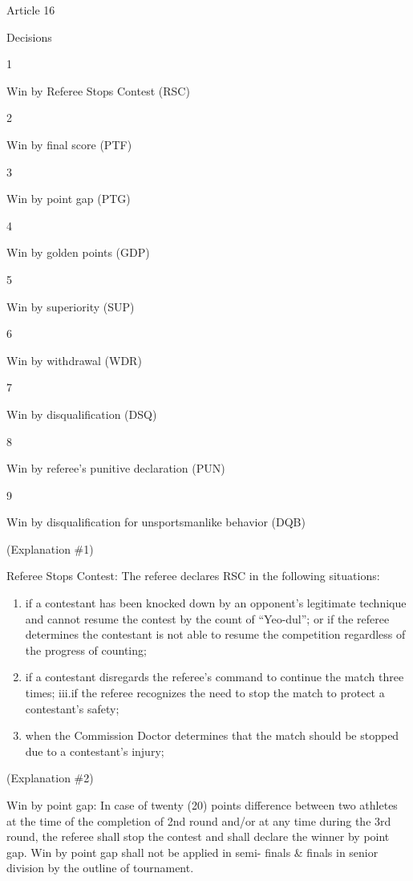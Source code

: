 \documentclass[
]{report}
\providecommand{\tightlist}{%
  \setlength{\itemsep}{0pt}\setlength{\parskip}{0pt}}
\renewcommand{\labelenumi}{\arabic{enumi}}
\begin{document}
Article 16

Decisions

1

Win by Referee Stops Contest (RSC)

2

Win by final score (PTF)

3

Win by point gap (PTG)

4

Win by golden points (GDP)

5

Win by superiority (SUP)

6

Win by withdrawal (WDR)

7

Win by disqualification (DSQ)

8

Win by referee's punitive declaration (PUN)

9

Win by disqualification for unsportsmanlike behavior (DQB)

(Explanation \#1)

Referee Stops Contest: The referee declares RSC in the following
situations:

\begin{enumerate}
\def\labelenumi{\roman{enumi}.}
\tightlist
\item
  if a contestant has been knocked down by an opponent's legitimate
  technique and cannot resume the contest by the count of ``Yeo-dul'';
  or if the referee determines the contestant is not able to resume the
  competition regardless of the progress of counting;
\item
  if a contestant disregards the referee's command to continue the match
  three times; iii.if the referee recognizes the need to stop the match
  to protect a contestant's safety;
\item
  when the Commission Doctor determines that the match should be stopped
  due to a contestant's injury;
\end{enumerate}

(Explanation \#2)

Win by point gap: In case of twenty (20) points difference between two
athletes at the time of the completion of 2nd round and/or at any time
during the 3rd round, the referee shall stop the contest and shall
declare the winner by point gap. Win by point gap shall not be applied
in semi- finals \& finals in senior division by the outline of
tournament.
\end{document}
